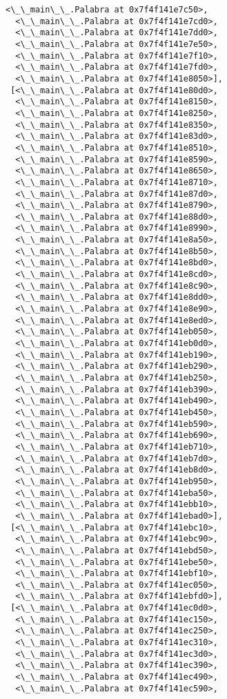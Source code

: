 \documentclass[12pt,a4paper,table]{article}
\begin{document}
\begin{tcolorbox}[breakable, size=fbox, boxrule=.5pt, pad at break*=1mm, opacityfill=0]
\begin{Verbatim}[commandchars=\\\{\}]
  <\_\_main\_\_.Palabra at 0x7f4f141e7c50>,
  <\_\_main\_\_.Palabra at 0x7f4f141e7cd0>,
  <\_\_main\_\_.Palabra at 0x7f4f141e7dd0>,
  <\_\_main\_\_.Palabra at 0x7f4f141e7e50>,
  <\_\_main\_\_.Palabra at 0x7f4f141e7f10>,
  <\_\_main\_\_.Palabra at 0x7f4f141e7fd0>,
  <\_\_main\_\_.Palabra at 0x7f4f141e8050>],
 [<\_\_main\_\_.Palabra at 0x7f4f141e80d0>,
  <\_\_main\_\_.Palabra at 0x7f4f141e8150>,
  <\_\_main\_\_.Palabra at 0x7f4f141e8250>,
  <\_\_main\_\_.Palabra at 0x7f4f141e8350>,
  <\_\_main\_\_.Palabra at 0x7f4f141e83d0>,
  <\_\_main\_\_.Palabra at 0x7f4f141e8510>,
  <\_\_main\_\_.Palabra at 0x7f4f141e8590>,
  <\_\_main\_\_.Palabra at 0x7f4f141e8650>,
  <\_\_main\_\_.Palabra at 0x7f4f141e8710>,
  <\_\_main\_\_.Palabra at 0x7f4f141e87d0>,
  <\_\_main\_\_.Palabra at 0x7f4f141e8790>,
  <\_\_main\_\_.Palabra at 0x7f4f141e88d0>,
  <\_\_main\_\_.Palabra at 0x7f4f141e8990>,
  <\_\_main\_\_.Palabra at 0x7f4f141e8a50>,
  <\_\_main\_\_.Palabra at 0x7f4f141e8b50>,
  <\_\_main\_\_.Palabra at 0x7f4f141e8bd0>,
  <\_\_main\_\_.Palabra at 0x7f4f141e8cd0>,
  <\_\_main\_\_.Palabra at 0x7f4f141e8c90>,
  <\_\_main\_\_.Palabra at 0x7f4f141e8dd0>,
  <\_\_main\_\_.Palabra at 0x7f4f141e8e90>,
  <\_\_main\_\_.Palabra at 0x7f4f141e8ed0>,
  <\_\_main\_\_.Palabra at 0x7f4f141eb050>,
  <\_\_main\_\_.Palabra at 0x7f4f141eb0d0>,
  <\_\_main\_\_.Palabra at 0x7f4f141eb190>,
  <\_\_main\_\_.Palabra at 0x7f4f141eb290>,
  <\_\_main\_\_.Palabra at 0x7f4f141eb250>,
  <\_\_main\_\_.Palabra at 0x7f4f141eb390>,
  <\_\_main\_\_.Palabra at 0x7f4f141eb490>,
  <\_\_main\_\_.Palabra at 0x7f4f141eb450>,
  <\_\_main\_\_.Palabra at 0x7f4f141eb590>,
  <\_\_main\_\_.Palabra at 0x7f4f141eb690>,
  <\_\_main\_\_.Palabra at 0x7f4f141eb710>,
  <\_\_main\_\_.Palabra at 0x7f4f141eb7d0>,
  <\_\_main\_\_.Palabra at 0x7f4f141eb8d0>,
  <\_\_main\_\_.Palabra at 0x7f4f141eb950>,
  <\_\_main\_\_.Palabra at 0x7f4f141eba50>,
  <\_\_main\_\_.Palabra at 0x7f4f141ebb10>,
  <\_\_main\_\_.Palabra at 0x7f4f141ebad0>],
 [<\_\_main\_\_.Palabra at 0x7f4f141ebc10>,
  <\_\_main\_\_.Palabra at 0x7f4f141ebc90>,
  <\_\_main\_\_.Palabra at 0x7f4f141ebd50>,
  <\_\_main\_\_.Palabra at 0x7f4f141ebe50>,
  <\_\_main\_\_.Palabra at 0x7f4f141ebf10>,
  <\_\_main\_\_.Palabra at 0x7f4f141ec050>,
  <\_\_main\_\_.Palabra at 0x7f4f141ebfd0>],
 [<\_\_main\_\_.Palabra at 0x7f4f141ec0d0>,
  <\_\_main\_\_.Palabra at 0x7f4f141ec150>,
  <\_\_main\_\_.Palabra at 0x7f4f141ec250>,
  <\_\_main\_\_.Palabra at 0x7f4f141ec310>,
  <\_\_main\_\_.Palabra at 0x7f4f141ec3d0>,
  <\_\_main\_\_.Palabra at 0x7f4f141ec390>,
  <\_\_main\_\_.Palabra at 0x7f4f141ec490>,
  <\_\_main\_\_.Palabra at 0x7f4f141ec590>,

\end{Verbatim}
\end{tcolorbox}
\end{document}
